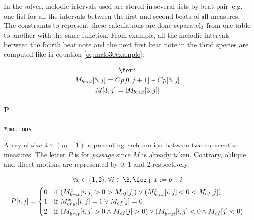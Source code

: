 In the solver, melodic intervals used are stored in several lists by beat pair, e.g. one list for all the intervals between the first and second beats of all measures. The constraints to represent these calculations are done separately from one table to another with the same function. From example, all the melodic intervals between the fourth beat note and the next first beat note in the thrid species are computed like in equation \ref{eq:melo30example}:

\begin{equation}
    \begin{gathered}
        \forj\\
        M_{brut}[3, j] = Cp[0, j+1] - Cp[3, j]\\
        M[3, j] = \left|M_{brut}[3, j]\right|\\
    \end{gathered}
    \label{eq:melo30example}
\end{equation}

\paragraph{P} \texttt{*motions} %

Array of size $4\times (m-1)$ representing each motion between two consecutive measures. The letter $P$ is for \textit{passage} since $M$ is already taken.
Contrary, oblique and direct motions are represented by 0, 1 and 2 respectively.

\begin{equation}
    \begin{gathered}
        \forall x \in \{1, 2\}, \forall i \in \B, \forj, x := b-i\\
        P[i, j] =
        \begin{cases}
            0 & \text{if } (M^{x}_{brut}[i, j] > 0 > M_{cf}[j]) \lor (M^{x}_{brut}[i, j] < 0 < M_{cf}[j]) \\
            1 & \text{if } M^{x}_{brut}[i, j] = 0 \lor M_{cf}[j] = 0 \\
            2 & \text{if } (M^{x}_{brut}[i, j] > 0 \land M_{cf}[j] > 0) \lor (M^{x}_{brut}[i, j] < 0 \land M_{cf}[j] < 0)
        \end{cases}
    \end{gathered}
\end{equation}


